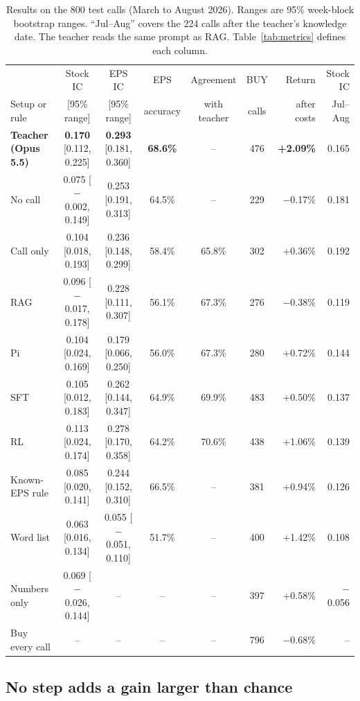 \documentclass[sigconf,nonacm]{acmart}
\newcommand{\rng}[2]{{\scriptsize[#1, #2]}}
\begin{document}
\begin{table}[t]
\caption{Results on the 800 test calls (March to August 2026). Ranges are 95\% week-block bootstrap ranges. ``Jul--Aug'' covers the 224 calls after the teacher's knowledge date. The teacher reads the same prompt as RAG. Table~\ref{tab:metrics} defines each column.}
\label{tab:main}
\small
\begin{tabular}{lcccccrr}
\toprule
 & Stock IC & EPS IC & EPS & Agreement & BUY & Return & Stock IC \\
Setup or rule & {\scriptsize[95\% range]} & {\scriptsize[95\% range]} & accuracy & with teacher & calls & after costs & Jul--Aug \\
\midrule
\textbf{Teacher (Opus 5.5)} & \textbf{0.170} \rng{0.112}{0.225} & \textbf{0.293} \rng{0.181}{0.360} & \textbf{68.6\%} & -- & 476 & \textbf{+2.09\%} & 0.165 \\
\midrule
No call & 0.075 \rng{$-$0.002}{0.149} & 0.253 \rng{0.191}{0.313} & 64.5\% & -- & 229 & $-$0.17\% & 0.181 \\
Call only & 0.104 \rng{0.018}{0.193} & 0.236 \rng{0.148}{0.299} & 58.4\% & 65.8\% & 302 & +0.36\% & 0.192 \\
RAG & 0.096 \rng{$-$0.017}{0.178} & 0.228 \rng{0.111}{0.307} & 56.1\% & 67.3\% & 276 & $-$0.38\% & 0.119 \\
Pi & 0.104 \rng{0.024}{0.169} & 0.179 \rng{0.066}{0.250} & 56.0\% & 67.3\% & 280 & +0.72\% & 0.144 \\
SFT & 0.105 \rng{0.012}{0.183} & 0.262 \rng{0.144}{0.347} & 64.9\% & 69.9\% & 483 & +0.50\% & 0.137 \\
RL & 0.113 \rng{0.024}{0.174} & 0.278 \rng{0.170}{0.358} & 64.2\% & 70.6\% & 438 & +1.06\% & 0.139 \\
\midrule
Known-EPS rule & 0.085 \rng{0.020}{0.141} & 0.244 \rng{0.152}{0.310} & 66.5\% & -- & 381 & +0.94\% & 0.126 \\
Word list & 0.063 \rng{0.016}{0.134} & 0.055 \rng{$-$0.051}{0.110} & 51.7\% & -- & 400 & +1.42\% & 0.108 \\
Numbers only & 0.069 \rng{$-$0.026}{0.144} & -- & -- & -- & 397 & +0.58\% & $-$0.056 \\
Buy every call & -- & -- & -- & -- & 796 & $-$0.68\% & -- \\
\bottomrule
\end{tabular}
\end{table}

\subsection{No step adds a gain larger than chance}
\end{document}
